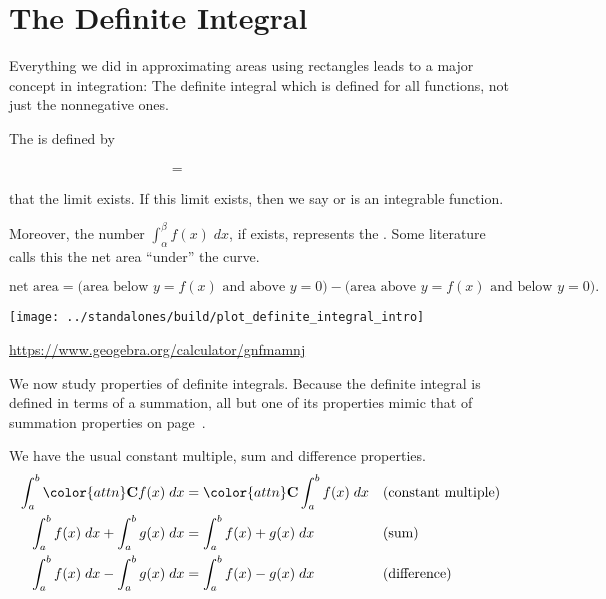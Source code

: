 \documentclass[../main.tex]{subfiles}
\begin{document}
 \section{The Definite Integral}
  Everything we did in approximating areas using rectangles leads to a major concept in integration: The definite integral which is defined for all functions, not just the nonnegative ones.
  \begin{mdframed}[style=withref-compact]
    The  is defined by 
    \begin{equation} \label{eq:definite-integral} 
      \phantom{\int_{\alpha}^{\beta} f(x) \;dx} = \hspace{3in}
    \end{equation}
     that the limit exists. If this limit exists, then we say  or is an integrable function. 

    Moreover, the number \(\int_{\alpha}^{\beta} f(x) \;dx\), if exists, represents the  . Some literature calls this the net area ``under'' the curve.
  \end{mdframed}
  \[
    \text{net area} = \bigg(\text{area below \(y = f(x)\) and above \(y = 0\)}\bigg) - \bigg(\text{area above \(y = f(x)\) and below \(y = 0\)}\bigg).
  \]
  
  \texttt{[image: ../standalones/build/plot\_definite\_integral\_intro]}

  \url{https://www.geogebra.org/calculator/gnfmamnj}
  

  \bigskip
  We now study properties of definite integrals. Because the definite integral is defined in terms of a summation, all but one of its properties mimic that of summation properties on page~\pageref{page:summation-properties}.

  We have the usual constant multiple, sum and difference properties.
  \begin{align*}
    \int_{a}^{b} {\color{attn} \mathbf{C}} f(x) \;dx &= {\color{attn} \mathbf{C}} \int_{a}^{b} f(x) \;dx && \text{(constant multiple)}\\
    \int_{a}^{b} f(x) \;dx + \int_{a}^{b} g(x) \;dx &= \int_{a}^{b} f(x) + g(x) \;dx && \text{(sum)} \\
    \int_{a}^{b} f(x) \;dx - \int_{a}^{b} g(x) \;dx &= \int_{a}^{b} f(x) - g(x) \;dx && \text{(difference)}
  \end{align*}
  \clearpage
    
\end{document}
